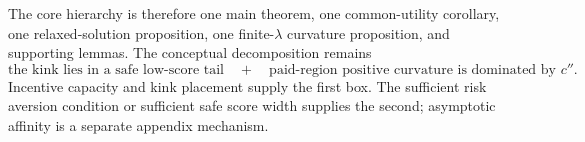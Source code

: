 \documentclass[11pt]{article}
\theoremstyle{remark}
\begin{document}
The core hierarchy is therefore one main theorem, one common-utility corollary,
one relaxed-solution proposition, one finite-$\lambda$ curvature proposition,
and supporting lemmas.  The conceptual decomposition remains
\[
 \boxed{\text{the kink lies in a safe low-score tail}}
 \quad+\quad
 \boxed{\text{paid-region positive curvature is dominated by }c''}.
\]
Incentive capacity and kink placement supply the first box.  The sufficient
risk aversion condition or sufficient safe score width supplies the second;
asymptotic affinity is a
separate appendix mechanism.
\end{document}
